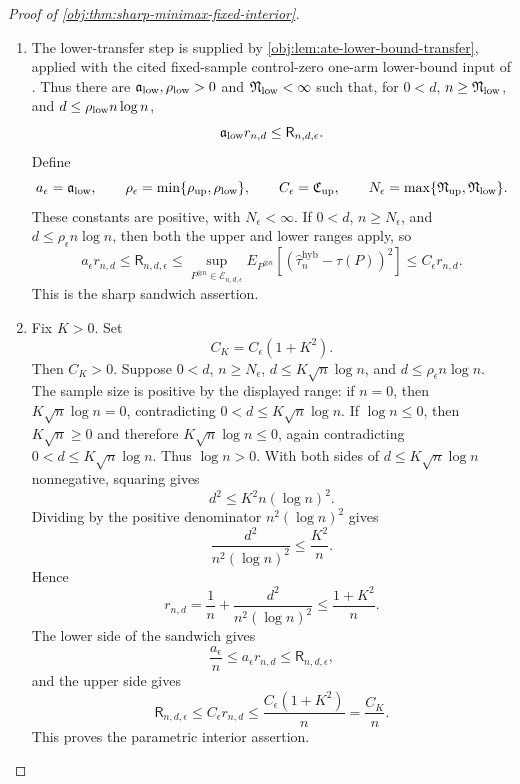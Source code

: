 \begin{proof}[Proof of \cref{obj:thm:sharp-minimax-fixed-interior}]
\begin{enumerate}
\item The lower-transfer step is supplied by \cref{obj:lem:ate-lower-bound-transfer}, applied with the cited fixed-sample control-zero one-arm lower-bound input of \citet{ZengBalakrishnanHanKennedy2024}.  Thus there are
\(\mathfrak a_{\rm low},\mathfrak\rho_{\rm low}>0\) and
\(\mathfrak N_{\rm low}<\infty\) such that, for \(0<d\),
\(n\ge\mathfrak N_{\rm low}\), and
\(d\le \mathfrak\rho_{\rm low}n\log n\),
\[
\mathfrak a_{\rm low} r_{n,d}\le \mathsf R_{n,d,\epsilon}.
\]
Define
\[
a_\epsilon=\mathfrak a_{\rm low},\qquad
\rho_\epsilon=\min\{\mathfrak\rho_{\rm up},\mathfrak\rho_{\rm low}\},\qquad
C_\epsilon=\mathfrak C_{\rm up},\qquad
N_\epsilon=\max\{\mathfrak N_{\rm up},\mathfrak N_{\rm low}\}.
\]
These constants are positive, with \(N_\epsilon<\infty\).  If \(0<d\),
\(n\ge N_\epsilon\), and \(d\le\rho_\epsilon n\log n\), then both the upper and lower
ranges apply, so
\[
a_\epsilon r_{n,d}
\le
\mathsf R_{n,d,\epsilon}
\le
\sup_{P^{\otimes n}\in\mathcal E_{n,d,\epsilon}}
E_{P^{\otimes n}}\!\left[
\left(\widehat\tau_n^{\mathrm{hyb}}-\tau(P)\right)^2
\right]
\le
C_\epsilon r_{n,d}.
\]
This is the sharp sandwich assertion.

\item Fix \(K>0\).  Set
\[
C_K=C_\epsilon(1+K^2).
\]
Then \(C_K>0\).  Suppose \(0<d\), \(n\ge N_\epsilon\),
\(d\le K\sqrt n\log n\), and \(d\le\rho_\epsilon n\log n\).  The sample size is positive by the displayed range: if \(n=0\), then \(K\sqrt n\log n=0\), contradicting \(0<d\le K\sqrt n\log n\).  If \(\log n\le0\), then
\(K\sqrt n\ge0\) and therefore \(K\sqrt n\log n\le0\), again contradicting
\(0<d\le K\sqrt n\log n\).  Thus \(\log n>0\).
With both sides of \(d\le K\sqrt n\log n\) nonnegative, squaring gives
\[
d^2\le K^2 n(\log n)^2.
\]
Dividing by the positive denominator \(n^2(\log n)^2\) gives
\[
\frac{d^2}{n^2(\log n)^2}\le \frac{K^2}{n}.
\]
Hence
\[
r_{n,d}
=
\frac1n+\frac{d^2}{n^2(\log n)^2}
\le
\frac{1+K^2}{n}.
\]
The lower side of the sandwich gives
\[
\frac{a_\epsilon}{n}
\le
a_\epsilon r_{n,d}
\le
\mathsf R_{n,d,\epsilon},
\]
and the upper side gives
\[
\mathsf R_{n,d,\epsilon}
\le
C_\epsilon r_{n,d}
\le
\frac{C_\epsilon(1+K^2)}{n}
=
\frac{C_K}{n}.
\]
This proves the parametric interior assertion.


\end{enumerate}
\end{proof}
